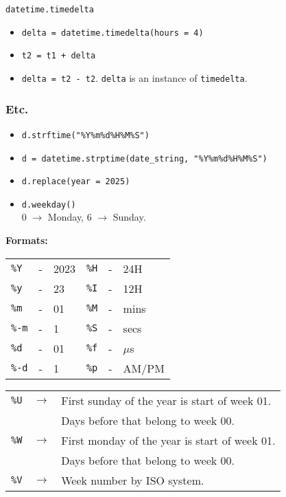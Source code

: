 \begin{center}
    \large{\texttt{datetime.timedelta}}
\end{center}

\begin{itemize}
\item \texttt{delta = datetime.timedelta(hours = 4)}
\item \texttt{t2 = t1 + delta}
\item \texttt{delta = t2 - t2}. \texttt{delta} is an instance of \texttt{timedelta}.\\
\end{itemize}

\subsubsection{Etc.}

\begin{itemize}
\item \texttt{d.strftime("\%Y\%m\%d\%H\%M\%S")}
\item \texttt{d = datetime.strptime(date\_string, "\%Y\%m\%d\%H\%M\%S")}
\item \texttt{d.replace(year = 2025)}
\item \texttt{d.weekday()}\\
        0 $\to$ Monday, 6 $\to$ Sunday.\\
\end{itemize}  

\textbf{Formats:}\\
\vspace{2pt}
\begin{tabular}{lcl|lcl}
    \hline
    \texttt{\%Y}  & - & 2023     &   \texttt{\%H}  & - &    24H\\
    \texttt{\%y}  & - & 23       &   \texttt{\%I}  & - &    12H\\
    \texttt{\%m}  & - & 01       &   \texttt{\%M}  & - &    mins\\
    \texttt{\%-m} & - & 1        &   \texttt{\%S}  & - &    secs\\
    \texttt{\%d}  & - & 01       &   \texttt{\%f}  & - &    $\mu$s\\
    \texttt{\%-d} & - & 1        &   \texttt{\%p}  & - &    AM/PM\\
    \hline
\end{tabular} 


\begin{tabularx}{\linewidth}{lcX}
    
\texttt{\%U}    & $\to$ & First sunday of the year is start of week 01.\\
                &       & Days before that belong to week 00.\\ 
\texttt{\%W}    & $\to$ & First monday of the year is start of week 01.\\
                &       & Days before that belong to week 00.\\ 
\texttt{\%V}    & $\to$ & Week number by ISO system.\\

\end{tabularx}


